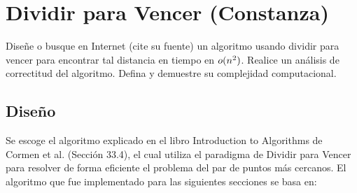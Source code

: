 \documentclass[main.tex]{subfiles}
\begin{document}
\section{Dividir para Vencer (Constanza)}

Diseñe o busque en Internet (cite su fuente) un algoritmo  usando
dividir para vencer para encontrar tal distancia en tiempo en $o(n^2)$. Realice un análisis
de correctitud del algoritmo. Defina y demuestre su complejidad computacional.


\subsection{Diseño}

Se escoge el algoritmo explicado en el libro Introduction to Algorithms de Cormen et al.
(Sección 33.4), el cual utiliza el paradigma de Dividir para Vencer para resolver de forma eficiente
el problema del par de puntos más cercanos. El algoritmo que fue implementado para las
siguientes secciones se basa en:
\end{document}
